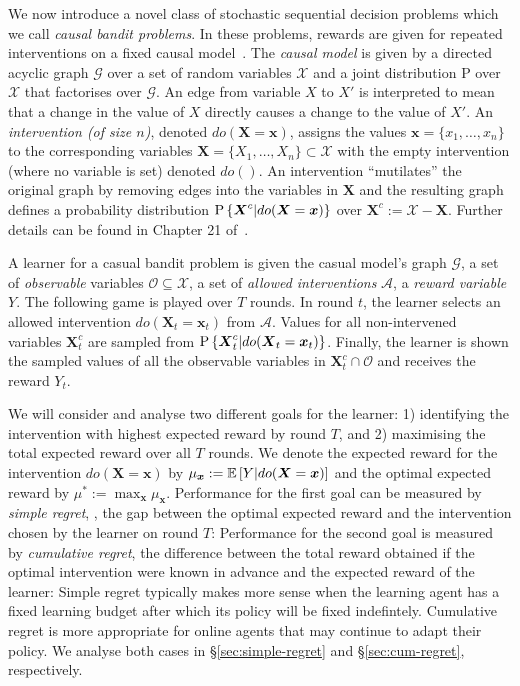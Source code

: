 \newcommand{\bernoulli}{\operatorname{Bernoulli}}
\newcommand{\dirac}{\operatorname{Dirac}}
\renewcommand{\vec}[1]{\boldsymbol{#1}}

We now introduce a novel class of stochastic sequential decision problems which we call \emph{causal bandit problems}. In these problems, rewards are given for repeated interventions on a fixed causal model~\cite{Pearl2000}. 
The \emph{causal model} is given by a directed acyclic graph $\mathcal{G}$ over a set of random variables $\mathcal{X}$ and a joint distribution $\mathrm{P}$ over $\mathcal{X}$ that factorises over $\mathcal{G}$. An edge from variable $X$ to $X'$ is interpreted to mean that a change in the value of $X$ directly causes a change to the value of $X'$. 
An \emph{intervention (of size $n$)}, denoted $do(\vec{X}=\vec{x})$, assigns the values $\vec{x}=\{x_1, \ldots, x_n\}$ to the corresponding variables $\vec{X}=\{X_1, \ldots, X_n\} \subset \mathcal{X}$ with the empty intervention (where no variable is set) denoted $do()$.
An intervention ``mutilates'' the original graph by removing edges into the variables in $\vec{X}$ and the resulting graph defines a probability distribution $\P{\vec{X}^c | do(\vec{X}=\vec{x})}$ over $\vec{X}^c := \mathcal{X} - \vec{X}$. 
Further details can be found in Chapter 21 of~\cite{Koller2009}.

A learner for a casual bandit problem is given the casual model's graph $\mathcal{G}$, a set of \emph{observable} variables $\mathcal{O} \subseteq \mathcal{X}$, a set of \emph{allowed interventions} $\mathcal{A}$, a \emph{reward variable} $Y$. The following game is played over $T$ rounds. 
In round $t$, the learner selects an allowed intervention $do(\vec{X}_t = \vec{x}_t)$ from $\mathcal{A}$.
Values for all non-intervened variables $\vec{X}^c_t$ are sampled from $\P{\vec{X}^c_t | do(\vec{X}_t = \vec{x}_t)}$. Finally, the learner is shown the sampled values of all the observable variables in $\vec{X}^c_t \cap \mathcal{O}$ and receives the reward $Y_t$.

We will consider and analyse two different goals for the learner: 1) identifying the intervention with highest expected reward by round $T$, and 2) maximising the total expected reward over all $T$ rounds. 
We denote the expected reward for the intervention $do(\vec{X} = \vec{x})$ by $\mu_{\vec{x}} := \E{Y | do(\vec{X} = \vec{x})}$ and the optimal expected reward by $\mu^* := \max_{\vec{x}} \mu_{\vec{x}}$.
Performance for the first goal can be measured by \emph{simple regret}, \ie, the gap between the optimal expected reward and the intervention chosen by the learner on round $T$:
\eqn{
\label{eq:regret-simple}
\simpleregret = \mu^* - \E{\mu_{\vec{x}_T}}\,.
}
Performance for the second goal is measured by \emph{cumulative regret}, the difference between the total reward obtained if the optimal intervention were known in advance and the expected reward of the learner:
Simple regret typically makes more sense when the learning agent has a fixed learning budget after which its policy will be fixed indefintely. Cumulative
regret is more appropriate for online agents that may continue to adapt their policy. We analyse both cases in
\S\ref{sec:simple-regret} and \S\ref{sec:cum-regret}, respectively.

